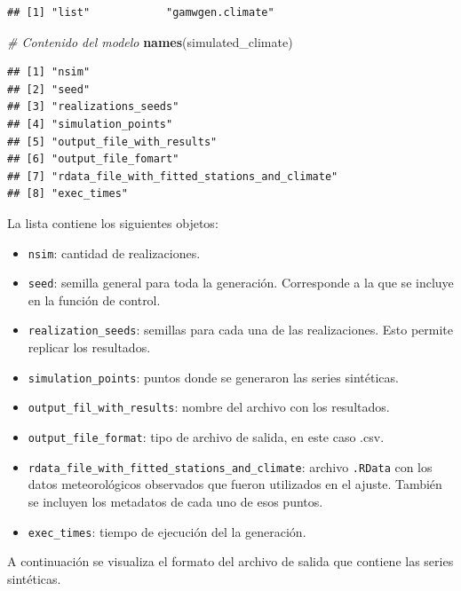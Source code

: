 \documentclass[
  12pt]{article}
\newenvironment{Shaded}{}{}
\newcommand{\CommentTok}[1]{\textcolor[rgb]{0.38,0.63,0.69}{\textit{#1}}}
\newcommand{\KeywordTok}[1]{\textcolor[rgb]{0.00,0.44,0.13}{\textbf{#1}}}
\newcommand{\NormalTok}[1]{#1}
\providecommand{\tightlist}{%
  \setlength{\itemsep}{0pt}\setlength{\parskip}{0pt}}
\begin{document}
\begin{verbatim}
## [1] "list"            "gamwgen.climate"
\end{verbatim}

\begin{Shaded}
\begin{Highlighting}[]
\CommentTok{# Contenido del modelo }
\KeywordTok{names}\NormalTok{(simulated_climate)}
\end{Highlighting}
\end{Shaded}

\begin{verbatim}
## [1] "nsim"                                       
## [2] "seed"                                       
## [3] "realizations_seeds"                         
## [4] "simulation_points"                          
## [5] "output_file_with_results"                   
## [6] "output_file_fomart"                         
## [7] "rdata_file_with_fitted_stations_and_climate"
## [8] "exec_times"
\end{verbatim}

La lista contiene los siguientes objetos:

\begin{itemize}
\tightlist
\item
  \texttt{nsim}: cantidad de realizaciones.
\item
  \texttt{seed}: semilla general para toda la generación. Corresponde a la que se incluye en la función de control.
\item
  \texttt{realization\_seeds}: semillas para cada una de las realizaciones. Esto permite replicar los resultados.
\item
  \texttt{simulation\_points}: puntos donde se generaron las series sintéticas.
\item
  \texttt{output\_fil\_with\_results}: nombre del archivo con los resultados.
\item
  \texttt{output\_file\_format}: tipo de archivo de salida, en este caso .csv.
\item
  \texttt{rdata\_file\_with\_fitted\_stations\_and\_climate}: archivo \texttt{.RData} con los datos meteorológicos observados que fueron utilizados en el ajuste. También se incluyen los metadatos de cada uno de esos puntos.
\item
  \texttt{exec\_times}: tiempo de ejecución del la generación.
\end{itemize}

A continuación se visualiza el formato del archivo de salida que contiene las series sintéticas.
\end{document}
